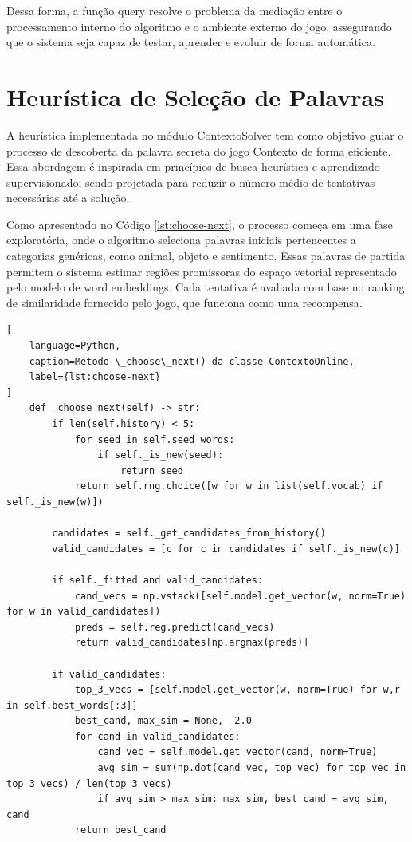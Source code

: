 Dessa forma, a função query resolve o problema da mediação entre o processamento interno do algoritmo e o ambiente externo do jogo, assegurando que o sistema seja capaz de testar, aprender e evoluir de forma automática.

\section{Heurística de Seleção de Palavras}
A heurística implementada no módulo ContextoSolver tem como objetivo guiar o processo de descoberta da palavra secreta do jogo Contexto de forma eficiente. Essa abordagem é inspirada em princípios de busca heurística e aprendizado supervisionado, sendo projetada para reduzir o número médio de tentativas necessárias até a solução.

Como apresentado no Código \ref{lst:choose-next}, o processo começa em uma fase exploratória, onde o algoritmo seleciona palavras iniciais pertencentes a categorias genéricas, como animal, objeto e sentimento. Essas palavras de partida permitem o sistema estimar regiões promissoras do espaço vetorial representado pelo modelo de word embeddings. Cada tentativa é avaliada com base no ranking de similaridade fornecido pelo jogo, que funciona como uma recompensa. 

\begin{lstlisting}[
    language=Python,
    caption=Método \_choose\_next() da classe ContextoOnline,
    label={lst:choose-next}
]
    def _choose_next(self) -> str:
        if len(self.history) < 5:
            for seed in self.seed_words:
                if self._is_new(seed):
                    return seed
            return self.rng.choice([w for w in list(self.vocab) if self._is_new(w)])

        candidates = self._get_candidates_from_history()
        valid_candidates = [c for c in candidates if self._is_new(c)]

        if self._fitted and valid_candidates:
            cand_vecs = np.vstack([self.model.get_vector(w, norm=True) for w in valid_candidates])
            preds = self.reg.predict(cand_vecs)
            return valid_candidates[np.argmax(preds)]

        if valid_candidates:
            top_3_vecs = [self.model.get_vector(w, norm=True) for w,r in self.best_words[:3]]
            best_cand, max_sim = None, -2.0
            for cand in valid_candidates:
                cand_vec = self.model.get_vector(cand, norm=True)
                avg_sim = sum(np.dot(cand_vec, top_vec) for top_vec in top_3_vecs) / len(top_3_vecs)
                if avg_sim > max_sim: max_sim, best_cand = avg_sim, cand
            return best_cand
\end{lstlisting}

